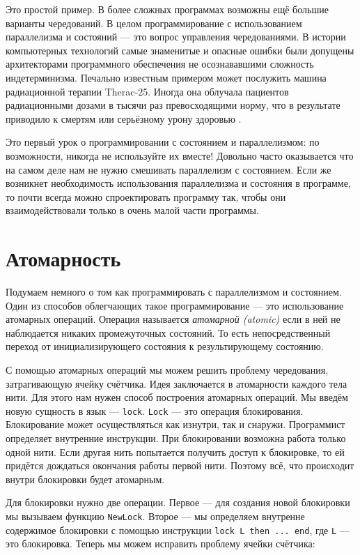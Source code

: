 Это простой пример. В более сложных программах возможны ещё большие варианты чередований. В целом программирование с использованием параллелизма и состояний --- это вопрос управления чередованиями. В истории компьютерных технологий самые знаменитые и опасные ошибки были допущены архитекторами программного обеспечения не осознававшими сложность индетерминизма. Печально известным примером может послужить машина радиационной терапии Therac-25. Иногда она облучала пациентов радиационными дозами в тысячи раз превосходящими норму, что в результате приводило к смертям или серьёзному урону здоровью \cite{112}.

Это первый урок о программировании с состоянием и параллелизмом: по возможности, никогда не используйте их вместе! Довольно часто оказывается что на самом деле нам не нужно смешивать параллелизм с состоянием. Если же возникнет необходимость использования параллелизма и состояния в программе, то почти всегда можно спроектировать программу так, чтобы они взаимодействовали только в очень малой части программы.

\section{Атомарность}

Подумаем немного о том как программировать с параллелизмом и состоянием. Один из способов облегчающих такое программирование --- это использование атомарных операций. Операция называется \emph{атомарной (atomic)} если в ней не наблюдается никаких промежуточных состояний. То есть непосредственный переход от инициализирующего состояния к результирующему состоянию.

С помощью атомарных операций мы можем решить проблему чередования, затрагивающую ячейку счётчика. Идея заключается в атомарности каждого тела нити. Для этого нам нужен способ построения атомарных операций. Мы введём новую сущность в язык --- \lstinline|lock|. \lstinline|Lock| --- это операция блокирования. Блокирование может осуществляться как изнутри, так и снаружи. Программист определяет внутренние инструкции. При блокировании возможна работа только одной нити. Если другая нить попытается получить доступ к блокировке, то ей придётся дождаться окончания работы первой нити. Поэтому всё, что происходит внутри блокировки будет атомарным.

Для блокировки нужно две операции. Первое --- для создания новой блокировки мы вызываем функцию \lstinline|NewLock|. Второе --- мы определяем внутренне содержимое блокировки с помощью инструкции \lstinline{lock L then ... end}, где \lstinline|L| --- это блокировка. Теперь мы можем исправить проблему ячейки счётчика:

